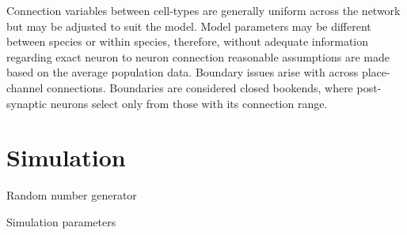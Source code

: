 Connection variables between cell-types are generally uniform across the network but may be adjusted to suit the model.
Model parameters may be different between species or within species, therefore, without adequate information regarding exact neuron to neuron connection reasonable assumptions are made based on the average population data.
Boundary issues arise with across place-channel connections.
Boundaries are considered closed bookends, where post-synaptic neurons select only from those with its connection range.


\section{Simulation}



Random number generator

Simulation parameters

